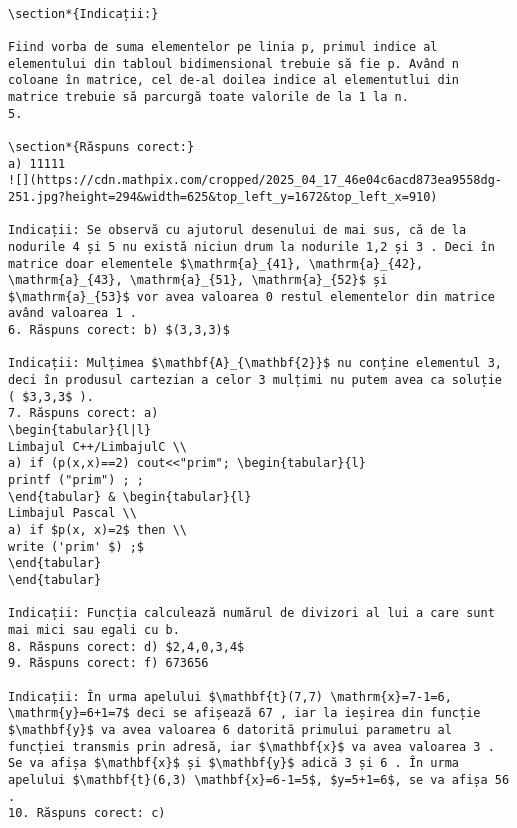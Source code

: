 \begin{verbatim}

\section*{Indicații:}

Fiind vorba de suma elementelor pe linia p, primul indice al elementului din tabloul bidimensional trebuie să fie p. Având n coloane în matrice, cel de-al doilea indice al elementutlui din matrice trebuie să parcurgă toate valorile de la 1 la n.
5.

\section*{Răspuns corect:}
a) 11111
![](https://cdn.mathpix.com/cropped/2025_04_17_46e04c6acd873ea9558dg-251.jpg?height=294&width=625&top_left_y=1672&top_left_x=910)

Indicații: Se observă cu ajutorul desenului de mai sus, că de la nodurile 4 și 5 nu există niciun drum la nodurile 1,2 și 3 . Deci în matrice doar elementele $\mathrm{a}_{41}, \mathrm{a}_{42}, \mathrm{a}_{43}, \mathrm{a}_{51}, \mathrm{a}_{52}$ și $\mathrm{a}_{53}$ vor avea valoarea 0 restul elementelor din matrice având valoarea 1 .
6. Răspuns corect: b) $(3,3,3)$

Indicații: Mulțimea $\mathbf{A}_{\mathbf{2}}$ nu conține elementul 3, deci în produsul cartezian a celor 3 mulțimi nu putem avea ca soluție ( $3,3,3$ ).
7. Răspuns corect: a)
\begin{tabular}{l|l} 
Limbajul C++/LimbajulC \\
a) if (p(x,x)==2) cout<<"prim"; \begin{tabular}{l} 
printf ("prim") ; ;
\end{tabular} & \begin{tabular}{l} 
Limbajul Pascal \\
a) if $p(x, x)=2$ then \\
write ('prim' $) ;$
\end{tabular}
\end{tabular}

Indicații: Funcția calculează numărul de divizori al lui a care sunt mai mici sau egali cu b.
8. Răspuns corect: d) $2,4,0,3,4$
9. Răspuns corect: f) 673656

Indicații: În urma apelului $\mathbf{t}(7,7) \mathrm{x}=7-1=6, \mathrm{y}=6+1=7$ deci se afișează 67 , iar la ieșirea din funcție $\mathbf{y}$ va avea valoarea 6 datorită primului parametru al funcției transmis prin adresă, iar $\mathbf{x}$ va avea valoarea 3 . Se va afișa $\mathbf{x}$ și $\mathbf{y}$ adică 3 și 6 . În urma apelului $\mathbf{t}(6,3) \mathbf{x}=6-1=5$, $y=5+1=6$, se va afișa 56 .
10. Răspuns corect: c)


\end{verbatim}
